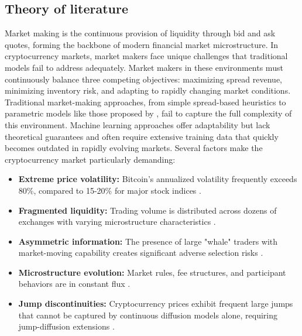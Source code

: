 \documentclass[onecolumn,ieee]{arithmaxresearch}
\begin{document}
\subsection{Theory of literature}

Market making is the continuous provision of liquidity through bid and ask quotes, forming the backbone of modern financial market microstructure. In cryptocurrency markets, market makers face unique challenges that traditional models fail to address adequately. Market makers in these environments must continuously balance three competing objectives: maximizing spread revenue, minimizing inventory risk, and adapting to rapidly changing market conditions. Traditional market-making approaches, from simple spread-based heuristics to parametric models like those proposed by \cite{avellaneda2008}, fail to capture the full complexity of this environment. Machine learning approaches \cite{spooner2018market} offer adaptability but lack theoretical guarantees and often require extensive training data that quickly becomes outdated in rapidly evolving markets. Several factors make the cryptocurrency market particularly demanding:

\begin{itemize}
    \item \textbf{Extreme price volatility:} Bitcoin's annualized volatility frequently exceeds 80\%, compared to 15-20\% for major stock indices \cite{baur2018bitcoin}.
    
    \item \textbf{Fragmented liquidity:} Trading volume is distributed across dozens of exchanges with varying microstructure characteristics \cite{makarov2020trading}.
    
    \item \textbf{Asymmetric information:} The presence of large "whale" traders with market-moving capability creates significant adverse selection risks \cite{cong2021crypto}.
    
    \item \textbf{Microstructure evolution:} Market rules, fee structures, and participant behaviors are in constant flux \cite{hautsch2019limits}.
    
    \item \textbf{Jump discontinuities:} Cryptocurrency prices exhibit frequent large jumps that cannot be captured by continuous diffusion models alone, requiring jump-diffusion extensions \cite{merton1976option}.
\end{itemize}
\end{document}
